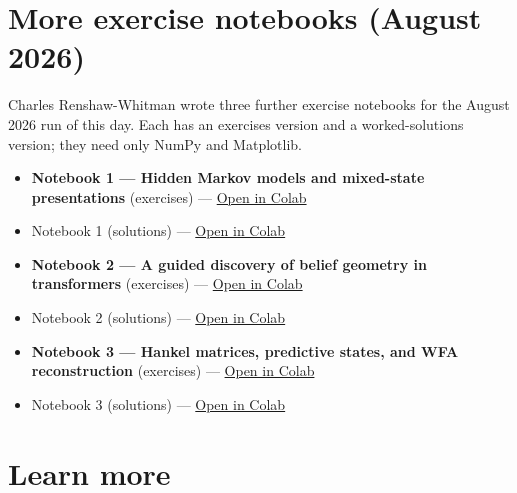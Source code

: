 \documentclass[11pt]{article}
\begin{document}
\section{More exercise notebooks (August 2026)}\label{sec:crw-notebooks}

Charles Renshaw-Whitman wrote three further exercise notebooks for the August
2026 run of this day. Each has an exercises version and a worked-solutions
version; they need only NumPy and Matplotlib.

\begin{itemize}
\item
  \textbf{Notebook 1 --- Hidden Markov models and mixed-state presentations} (exercises) --- \href{https://colab.research.google.com/github/CharlesR-W/IliadIntensiveCompMechDay/blob/main/notebooks/01_hmms_msps_exercises.ipynb}{Open in Colab}
\item
  Notebook 1 (solutions) --- \href{https://colab.research.google.com/github/CharlesR-W/IliadIntensiveCompMechDay/blob/main/notebooks/01_hmms_msps_solutions.ipynb}{Open in Colab}
\item
  \textbf{Notebook 2 --- A guided discovery of belief geometry in transformers} (exercises) --- \href{https://colab.research.google.com/github/CharlesR-W/IliadIntensiveCompMechDay/blob/main/notebooks/02_transformer_belief_geometry_exercises.ipynb}{Open in Colab}
\item
  Notebook 2 (solutions) --- \href{https://colab.research.google.com/github/CharlesR-W/IliadIntensiveCompMechDay/blob/main/notebooks/02_transformer_belief_geometry_solutions.ipynb}{Open in Colab}
\item
  \textbf{Notebook 3 --- Hankel matrices, predictive states, and WFA reconstruction} (exercises) --- \href{https://colab.research.google.com/github/CharlesR-W/IliadIntensiveCompMechDay/blob/main/notebooks/03_hankel_psr_wfa_exercises.ipynb}{Open in Colab}
\item
  Notebook 3 (solutions) --- \href{https://colab.research.google.com/github/CharlesR-W/IliadIntensiveCompMechDay/blob/main/notebooks/03_hankel_psr_wfa_solutions.ipynb}{Open in Colab}
\end{itemize}

\section{Learn more}\label{learn-more}
\end{document}
